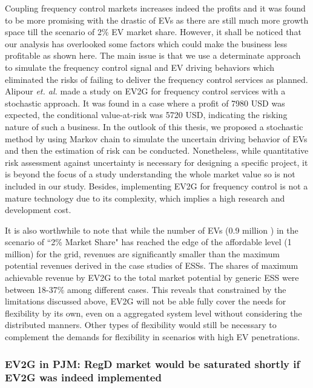 Coupling frequency control markets increases indeed the profits and it was found to be more promising with the drastic of EVs as there are still much more growth space till the scenario of 2\% EV market share. However, it shall be noticed that our analysis has overlooked some factors which could make the business less profitable as shown here. The main issue is that we use a determinate approach to simulate the frequency control signal and EV driving behaviors which eliminated the risks of failing to deliver the frequency control services as planned. Alipour \textit{et. al.}\cite{Alipour2017} made a study on EV2G for frequency control services with a stochastic approach. It was found in a case where a profit of 7980 USD was expected, the conditional value-at-risk was 5720 USD, indicating the risking nature of such a business. In the outlook of this thesis, we proposed a stochastic method by using Markov chain to simulate the uncertain driving behavior of EVs and then the estimation of risk can be conducted. Nonetheless, while quantitative risk assessment against uncertainty is necessary for designing a specific project, it is beyond the focus of a study understanding the whole market value so is not included in our study. Besides, implementing EV2G for frequency control is not a mature technology due to its complexity\cite{Peng2017}\cite{Shafie-Khah2015}\cite{Bessa2014}\cite{Bessa2013}, which implies a high research and development cost.

It is also worthwhile to note that while the number of EVs (0.9 million ) in the scenario of ``2\% Market Share" has reached the edge of the affordable level (1 million) for the grid, revenues are significantly smaller than the maximum potential revenues derived in the case studies of ESSs. The shares of maximum achievable revenue by EV2G to the total market potential by generic ESS were between 18-37\% among different cases. This reveals that constrained by the limitations discussed above, EV2G will not be able fully cover the needs for flexibility by its own, even on a aggregated system level without considering the distributed manners. Other types of flexibility would still be necessary to complement the demands for flexibility in scenarios with high EV penetrations.

\subsubsection{EV2G  in PJM: RegD market would be saturated shortly if EV2G was indeed implemented}

